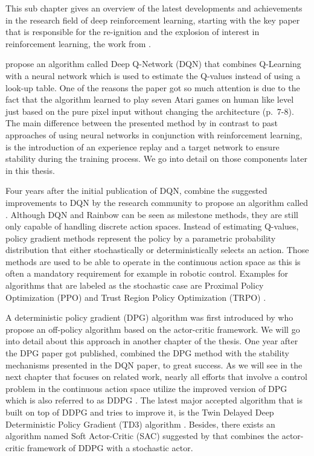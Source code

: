 This sub chapter gives an overview of the latest developments and achievements in the research field of deep reinforcement learning, starting with the key paper that is responsible for the re-ignition and the explosion of interest in reinforcement learning, the work from \cite{mnih2013playing, mnih2015human}.
\par 
\cite{mnih2013playing} propose an algorithm called Deep Q-Network
(DQN) that combines Q-Learning with a neural network which is used to estimate the Q-values instead of using a look-up table. One of the reasons the paper got so much attention is due to the fact that the algorithm learned to play seven Atari games on human like level just based on the pure pixel input without changing the architecture (p.~7-8). The main difference between the presented method by \cite{mnih2013playing} in contrast to past approaches of using neural networks in conjunction with reinforcement learning, is the introduction of an experience replay and a target network to ensure stability during the training process. We go into detail on those components later in this thesis.
\par
Four years after the initial publication of DQN, \cite{hessel2018rainbow} combine the suggested improvements to DQN by the research community to propose an algorithm called . Although DQN and Rainbow can be seen as milestone methods, they are still only capable of handling discrete action spaces. Instead of estimating Q-values, policy gradient methods represent the policy by a parametric probability distribution that either stochastically or deterministically selects an action. Those methods are used to be able to operate in the continuous action space as this is often a mandatory requirement for example in robotic control. Examples for algorithms that are labeled as the stochastic case are Proximal Policy Optimization (PPO) \cite[]{schulman2017proximal} and Trust Region Policy Optimization (TRPO) \cite[]{schulman2017trust}.
\par 
A deterministic policy gradient (DPG) algorithm was first introduced by \cite{silver2014deterministic} who propose an off-policy algorithm based on the actor-critic framework. We will go into detail about this approach in another chapter of the thesis. One year after the DPG paper got published, \cite{lillicrap2019continuous} combined the DPG method with the stability mechanisms presented in the DQN paper, to great success. As we will see in the next chapter that focuses on related work, nearly all efforts that involve  a control problem in the continuous action space utilize the improved version of DPG which is also referred to as DDPG \cite[p.~2]{lillicrap2019continuous}. The latest major accepted algorithm that is built on top of DDPG and tries to improve it, is the Twin Delayed Deep Deterministic Policy Gradient (TD3) algorithm \cite[]{fujimoto2018addressing}. Besides, there exists an algorithm named Soft Actor-Critic (SAC) suggested by \cite{haarnoja2018soft} that combines the actor-critic framework of DDPG with a stochastic actor.
